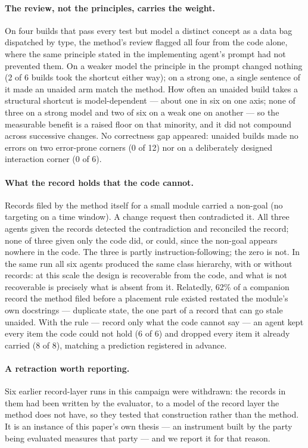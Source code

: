 \documentclass[11pt]{article}
\begin{document}
\paragraph{The review, not the principles, carries the weight.} On four builds that pass every test but model a distinct concept as a data bag dispatched by type, the method's review flagged all four from the code alone, where the same principle stated in the implementing agent's prompt had not prevented them. On a weaker model the principle in the prompt changed nothing (2 of 6 builds took the shortcut either way); on a strong one, a single sentence of it made an unaided arm match the method. How often an unaided build takes a structural shortcut is model-dependent --- about one in six on one axis; none of three on a strong model and two of six on a weak one on another --- so the measurable benefit is a raised floor on that minority, and it did not compound across successive changes. No correctness gap appeared: unaided builds made no errors on two error-prone corners (0 of 12) nor on a deliberately designed interaction corner (0 of 6).

\paragraph{What the record holds that the code cannot.} Records filed by the method itself for a small module carried a non-goal (no targeting on a time window). A change request then contradicted it. All three agents given the records detected the contradiction and reconciled the record; none of three given only the code did, or could, since the non-goal appears nowhere in the code. The three is partly instruction-following; the zero is not. In the same run all six agents produced the same class hierarchy, with or without records: at this scale the design is recoverable from the code, and what is not recoverable is precisely what is absent from it. Relatedly, 62\% of a companion record the method filed before a placement rule existed restated the module's own docstrings --- duplicate state, the one part of a record that can go stale unaided. With the rule --- record only what the code cannot say --- an agent kept every item the code could not hold (6 of 6) and dropped every item it already carried (8 of 8), matching a prediction registered in advance.

\paragraph{A retraction worth reporting.} Six earlier record-layer runs in this campaign were withdrawn: the records in them had been written by the evaluator, to a model of the record layer the method does not have, so they tested that construction rather than the method. It is an instance of this paper's own thesis --- an instrument built by the party being evaluated measures that party --- and we report it for that reason.
\end{document}
